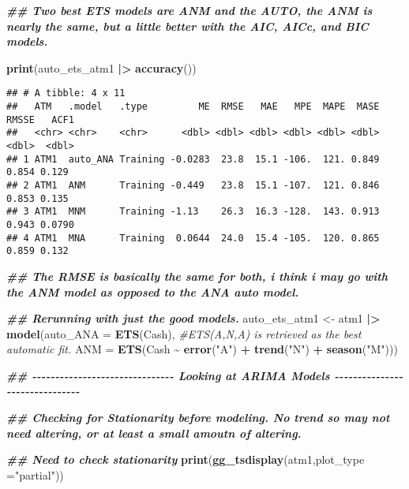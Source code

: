 \documentclass[
]{article}
\newenvironment{Shaded}{\begin{snugshade}}{\end{snugshade}}
\newcommand{\AttributeTok}[1]{\textcolor[rgb]{0.13,0.29,0.53}{#1}}
\newcommand{\CommentTok}[1]{\textcolor[rgb]{0.56,0.35,0.01}{\textit{#1}}}
\newcommand{\DocumentationTok}[1]{\textcolor[rgb]{0.56,0.35,0.01}{\textbf{\textit{#1}}}}
\newcommand{\FunctionTok}[1]{\textcolor[rgb]{0.13,0.29,0.53}{\textbf{#1}}}
\newcommand{\NormalTok}[1]{#1}
\newcommand{\OtherTok}[1]{\textcolor[rgb]{0.56,0.35,0.01}{#1}}
\newcommand{\SpecialCharTok}[1]{\textcolor[rgb]{0.81,0.36,0.00}{\textbf{#1}}}
\newcommand{\StringTok}[1]{\textcolor[rgb]{0.31,0.60,0.02}{#1}}
\begin{document}
\begin{Shaded}
\begin{Highlighting}[]
\DocumentationTok{\#\# Two best ETS models are ANM and the AUTO, the ANM is nearly the same, but a little better with the AIC, AICc, and BIC models.}

\FunctionTok{print}\NormalTok{(auto\_ets\_atm1 }\SpecialCharTok{|\textgreater{}} \FunctionTok{accuracy}\NormalTok{())}
\end{Highlighting}
\end{Shaded}

\begin{verbatim}
## # A tibble: 4 x 11
##   ATM   .model   .type         ME  RMSE   MAE   MPE  MAPE  MASE RMSSE   ACF1
##   <chr> <chr>    <chr>      <dbl> <dbl> <dbl> <dbl> <dbl> <dbl> <dbl>  <dbl>
## 1 ATM1  auto_ANA Training -0.0283  23.8  15.1 -106.  121. 0.849 0.854 0.129 
## 2 ATM1  ANM      Training -0.449   23.8  15.1 -107.  121. 0.846 0.853 0.135 
## 3 ATM1  MNM      Training -1.13    26.3  16.3 -128.  143. 0.913 0.943 0.0790
## 4 ATM1  MNA      Training  0.0644  24.0  15.4 -105.  120. 0.865 0.859 0.132
\end{verbatim}

\begin{Shaded}
\begin{Highlighting}[]
\DocumentationTok{\#\# The RMSE is basically the same for both, i think i may go with the ANM model as opposed to the ANA auto model. }

\DocumentationTok{\#\# Rerunning with just the good models.}
\NormalTok{auto\_ets\_atm1 }\OtherTok{\textless{}{-}}\NormalTok{ atm1 }\SpecialCharTok{|\textgreater{}} \FunctionTok{model}\NormalTok{(}\AttributeTok{auto\_ANA =} \FunctionTok{ETS}\NormalTok{(Cash), }\CommentTok{\#ETS(A,N,A) is retrieved as the best automatic fit. }
                               \AttributeTok{ANM =} \FunctionTok{ETS}\NormalTok{(Cash }\SpecialCharTok{\textasciitilde{}} \FunctionTok{error}\NormalTok{(}\StringTok{"A"}\NormalTok{) }\SpecialCharTok{+} \FunctionTok{trend}\NormalTok{(}\StringTok{"N"}\NormalTok{) }\SpecialCharTok{+} \FunctionTok{season}\NormalTok{(}\StringTok{"M"}\NormalTok{)))}


\DocumentationTok{\#\#   {-}{-}{-}{-}{-}{-}{-}{-}{-}{-}{-}{-}{-}{-}{-}{-}{-}{-}{-}{-}{-}{-}{-}{-}{-}{-}{-}{-}{-}{-}{-} Looking at ARIMA Models  {-}{-}{-}{-}{-}{-}{-}{-}{-}{-}{-}{-}{-}{-}{-}{-}{-}{-}{-}{-}{-}{-}{-}{-}{-}{-}{-}{-}{-}{-}{-}}

\DocumentationTok{\#\# Checking for Stationarity before modeling. No trend so may not need altering, or at least a small amoutn of altering.}

\DocumentationTok{\#\# Need to check stationarity }
\FunctionTok{print}\NormalTok{(}\FunctionTok{gg\_tsdisplay}\NormalTok{(atm1,}\AttributeTok{plot\_type =}\StringTok{"partial"}\NormalTok{)) }
\end{Highlighting}
\end{Shaded}
\end{document}
